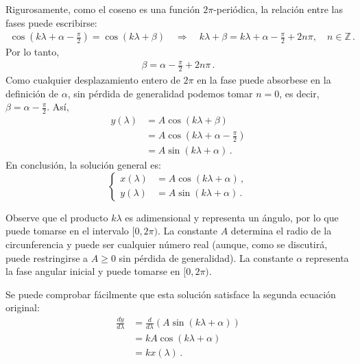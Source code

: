 \documentclass[../apunte_mecanica_clasica.tex]{subfiles}%
\begin{document}
Rigurosamente, como el coseno es una función $2\pi$-periódica, la relación entre las fases puede escribirse:
\begin{align*}
\cos\left(k\lambda + \alpha - \frac{\pi}{2}\right) = \cos(k\lambda + \beta) \quad \Rightarrow \quad k\lambda + \beta = k\lambda + \alpha - \frac{\pi}{2} + 2n\pi,\quad n \in \mathbb{Z} \,.
\end{align*}
Por lo tanto,
\begin{align*}
\beta = \alpha - \frac{\pi}{2} + 2n\pi\,.
\end{align*}
Como cualquier desplazamiento entero de $2\pi$ en la fase puede absorbese en la definición de $\alpha$, sin pérdida de generalidad podemos tomar $n=0$, es decir, $\beta = \alpha - \frac{\pi}{2}$.
Así,
\begin{align*}
y(\lambda) &= A \cos(k\lambda + \beta) \\[4pt]
&= A \cos\left(k\lambda + \alpha - \frac{\pi}{2}\right) \\[4pt]
&= A \sin(k\lambda + \alpha)\,.
\end{align*}
En conclusión, la solución general es:
\begin{equation} \label{sist_coor:solucion_mov_armonico_simple}
\left\{
\begin{aligned}
x(\lambda) &= A \cos(k\lambda + \alpha)\,, \\
y(\lambda) &= A \sin(k\lambda + \alpha)\,.
\end{aligned}
\right.
\end{equation}

Observe que el producto $k\lambda$ es adimensional y representa un ángulo, por lo que puede tomarse en el intervalo $[0, 2\pi)$.
La constante $A$ determina el radio de la circunferencia y puede ser cualquier número real (aunque, como se discutirá, puede restringirse a $A \geq 0$ sin pérdida de generalidad). La constante $\alpha$ representa la fase angular inicial y puede tomarse en $[0, 2\pi)$.

Se puede comprobar fácilmente que esta solución satisface la segunda ecuación original:
\begin{align*}
\frac{dy}{d\lambda} &= \frac{d}{d\lambda}\left(A \sin(k\lambda + \alpha)\right) \\[4pt]
&= kA \cos(k\lambda + \alpha) \\[4pt]
&= k x(\lambda)\,.
\end{align*}
\end{document}
